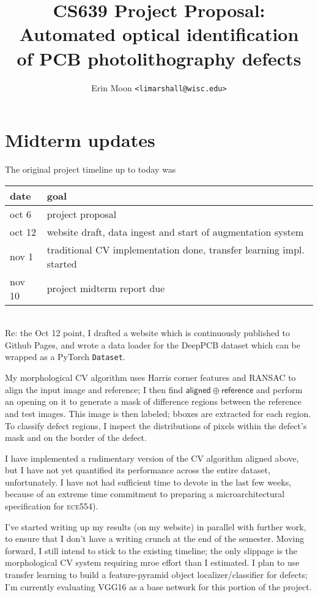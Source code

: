 \documentclass{article}
\title{{\Large CS639 Project Proposal:}\\Automated optical identification\\of PCB photolithography defects}
\author{Erin Moon \texttt{<limarshall@wisc.edu>}}
\newcommand*\lxor{\oplus}
\begin{document}
\maketitle

\section{Midterm updates}

The original project timeline up to today was

\begin{tabular}{l|l}
    \textbf{date} & \textbf{goal} \\
    \hline
    oct 6 & project proposal \\
    oct 12 & website draft, data ingest and start of augmentation system \\
    nov 1 & traditional CV implementation done, transfer learning impl. started \\
    nov 10 & project midterm report due \\
\end{tabular}\\

Re: the Oct 12 point, I drafted a website which is continuously published to Github Pages, and wrote a data loader for the DeepPCB dataset which can be wrapped as a PyTorch \texttt{Dataset}.

My morphological CV algorithm uses Harris corner features and RANSAC to align the input image and reference; I then find $\mathsf{aligned} \lxor \mathsf{reference}$ and perform an opening on it to generate a mask of difference regions between the reference and test images. This image is then labeled; bboxes are extracted for each region. To classify defect regions, I inspect the distributions of pixels within the defect's mask and on the border of the defect.

I have implemented a rudimentary version of the CV algorithm aligned above, but I have not yet quantified its performance across the entire dataset, unfortunately. I have not had sufficient time to devote in the last few weeks, because of an extreme time commitment to preparing a microarchitectural specification for \textsc{ece554}).

I've started writing up my results (on my website) in parallel with further work, to ensure that I don't have a writing crunch at the end of the semester. Moving forward, I still intend to stick to the existing timeline; the only slippage is the morphological CV system requiring mroe effort than I estimated. I plan to use transfer learning to build a feature-pyramid object localizer/classifier for defects; I'm currently evaluating VGG16 as a base network for this portion of the project.
\end{document}
